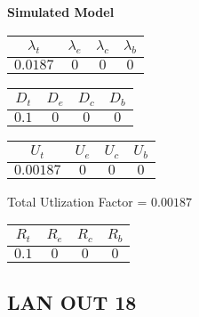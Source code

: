 \documentclass{article}
\begin{document}
\begin{minipage}{0.5\textwidth}
\centering	\textbf{Simulated Model}
\begin{table}[H]
\centering
\begin{tabular}{@{}cccc@{}}
\toprule
$\lambda_t$ & $\lambda_e$ & $\lambda_c$ & $\lambda_b$\\
\midrule
$0.0187$ & $0$ & $0$ & $0$\\
\bottomrule
\end{tabular}
\end{table}
\begin{table}[H]
\centering
\begin{tabular}{@{}cccc@{}}
\toprule
$D_t$ & $D_e$ & $D_c$ & $D_b$\\
\midrule
$0.1$ & $0$ & $0$ & $0$\\
\bottomrule
\end{tabular}
\end{table}\begin{table}[H]
\centering
\begin{tabular}{@{}cccc@{}}
\toprule
$U_t$ & $U_e$ & $U_c$ & $U_b$\\
\midrule
$0.00187$ & $0$ & $0$ & $0$\\
\bottomrule
\end{tabular}
\end{table}
\centering Total Utlization Factor = $0.00187$
\begin{table}[H]
\centering
\begin{tabular}{@{}cccc@{}}
\toprule
$R_t$ & $R_e$ & $R_c$ & $R_b$\\
\midrule
$0.1$ & $0$ & $0$ & $0$\\
\bottomrule
\end{tabular}
\end{table}
\end{minipage}\subsection{LAN OUT 18}
\end{document}
